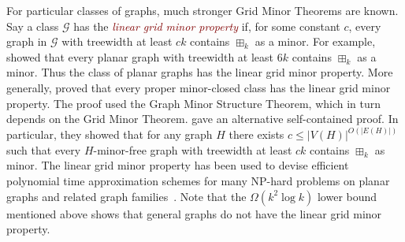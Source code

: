 \documentclass{patmorin}
\newcommand{\defn}[1]{\textcolor{Maroon}{\emph{#1}}}
\renewcommand{\leq}{\leqslant}
\newcommand{\GG}{\mathcal{G}}
\theoremstyle{plain}
\theoremstyle{definition}
\begin{document}
For particular classes of graphs, much stronger Grid Minor Theorems are known. Say a class $\GG$ has the \defn{linear grid minor property} if, for some constant $c$,  every graph in $\mathcal{G}$ with treewidth at least $ck $ contains $\boxplus_k$ as a minor. For example, 
\citet{RST-JCTB94} showed that every planar graph with treewidth at least $6k$ contains $\boxplus_k$ as a minor. Thus the class of planar graphs has the linear grid minor property. More generally, \citet{DemHaj-EuJC07} proved that every proper minor-closed class has the linear grid minor property. The proof used the Graph Minor Structure Theorem, which in turn depends on the Grid Minor Theorem. \citet{KK20} gave an alternative self-contained proof. In particular, they showed that for any graph $H$ there exists $c\leq |V(H)|^{O(|E(H)|)}$ such that 
every $H$-minor-free graph with treewidth at least $ck$ contains $\boxplus_k$ as minor. 
The linear grid minor property has been used to devise efficient polynomial time approximation schemes for many NP-hard problems on planar graphs and related graph families~\cite{DHK-Algo09,DFHT-JACM05,DH-Algo04, Eppstein-Algo00, FFLS18}. Note that the $\Omega(k^2\log k)$ lower bound mentioned above shows that general graphs do not have the linear grid minor property.

 
\end{document}
